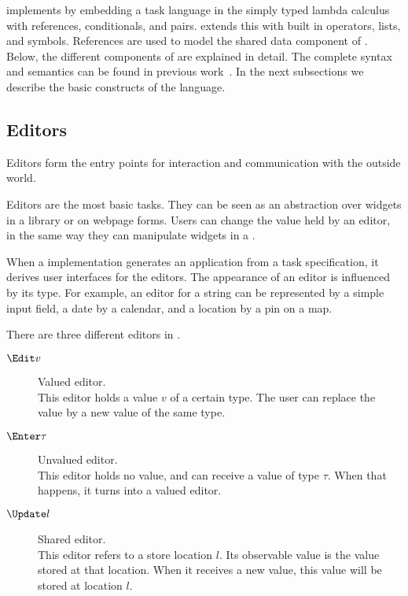 \TOPHAT implements \TOP by embedding a task language in the simply typed lambda calculus with references, conditionals, and pairs.
\STOPHAT extends this with built in operators, lists, and symbols.
References are used to model the shared data component of \TOP.
Below, the different components of \TOPHAT are explained in detail.
The complete syntax and semantics can be found in previous work~\cite{Steenvoorden2019}.
In the next subsections we describe the basic constructs of the \TOPHAT language.

%
%

\subsection{Editors}

Editors form the entry points for interaction and communication with the outside world.

Editors are the most basic tasks.
They can be seen as an abstraction over widgets in a \GUI library or on webpage forms.
Users can change the value held by an editor, in the same way they can manipulate widgets in a \GUI.

When a \TOP implementation generates an application from a task specification, it derives user interfaces for the editors.
The appearance of an editor is influenced by its type.
For example, an editor for a string can be represented by a simple input field, a date by a calendar, and a location by a pin on a map.

There are three different editors in \TOPHAT.
\begin{description}
  \item[$\Edit v$] Valued editor.\\
    This editor holds a value $v$ of a certain type.
    The user can replace the value by a new value of the same type.
  \item[$\Enter \tau$] Unvalued editor.\\
    This editor holds no value, and can receive a value of type $\tau$.
    When that happens, it turns into a valued editor.
  \item[$\Update l$] Shared editor.\\
    This editor refers to a store location $l$.
    Its observable value is the value stored at that location.
    When it receives a new value, this value will be stored at location $l$.
\end{description}


